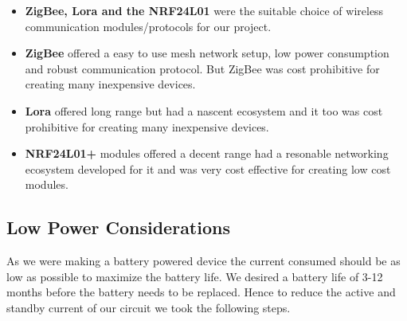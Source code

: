 \begin{itemize}
	\item \textbf{ZigBee, Lora and the NRF24L01} were the suitable choice of wireless communication modules/protocols for our project. 
	\item \textbf{ZigBee} offered a easy to use mesh network setup, low power consumption and robust communication protocol. But ZigBee was cost prohibitive for creating many inexpensive devices. 
	\item \textbf{Lora} offered long range but had a nascent ecosystem and it too was cost prohibitive for creating many inexpensive devices.
	\item \textbf{NRF24L01+} modules offered a decent range had a resonable networking ecosystem developed for it and was very cost effective for creating low cost modules.
\end{itemize}	

\subsection{Low Power Considerations}
As we were making a battery powered device the current consumed should be as low as possible to maximize the battery life.
We desired a battery life of 3-12 months before the battery needs to be replaced. Hence to reduce the active and standby current of our circuit we took the following steps.

